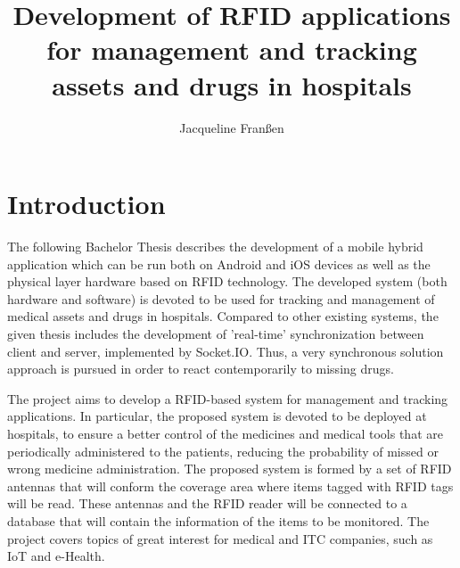 \documentclass[12pt,a4paper]{book}
\author{Jacqueline Franßen}
\title{Development of RFID applications for management and tracking assets and drugs in hospitals}
\newcommand\BackgroundPic{
\put(70,-40){
\parbox[b][\paperheight]{\paperwidth}{%
\texttt{[image: marca\_agua]}%
}}}
\begin{document}
\pagestyle{bloque_inicial} %


\cleardoublepage
\cleardoublepage
\tableofcontents
\cleardoublepage
{}
\listoffigures
\cleardoublepage
{}
\listoftables

\newtheorem{mydef}{Definition}
\newpage{} %
\pagestyle{doc_body} %

\chapter{\textbf{Introduction}}
The following Bachelor Thesis describes the development of a mobile hybrid application which can be run both on Android and iOS devices as well as the physical layer hardware based on RFID technology. The developed system (both hardware and software) is devoted to be used for tracking and management of medical assets and drugs in hospitals. Compared to other existing systems, the given thesis includes the development of 'real-time' synchronization between client and server, implemented by Socket.IO. Thus, a very synchronous solution approach is pursued in order to react contemporarily to missing drugs.

The project aims to develop a RFID-based system for management and tracking applications. In particular, the proposed system is devoted to be deployed at hospitals, to ensure a better control of the medicines and medical tools that are periodically administered to the patients, reducing the probability of missed or wrong medicine administration. The proposed system is formed by a set of RFID antennas that will conform the coverage area where items tagged with RFID tags will be read. These antennas and the RFID reader will be connected to a database that will contain the information of the items to be monitored. The project covers topics of great interest for medical and \ac{ITC} companies, such as IoT and e-Health.
\end{document}
